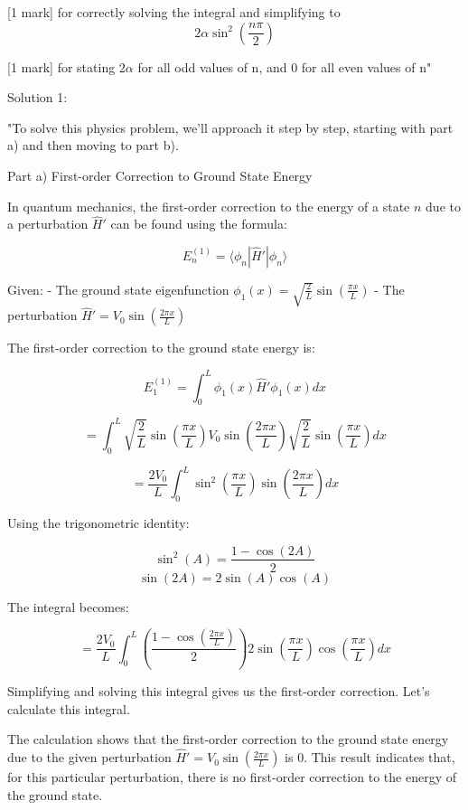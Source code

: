 [1 mark] for correctly solving the integral and simplifying to 
\[ 2 \alpha \sin^{2}\left(\frac{n \pi}{2} \right) \]

[1 mark] for stating \(2 \alpha \) for all odd values of n, and 0 for all even values of n"

Solution 1: 

"To solve this physics problem, we'll approach it step by step, starting with part a) and then moving to part b).

Part a) First-order Correction to Ground State Energy

In quantum mechanics, the first-order correction to the energy of a state \( n \) due to a perturbation \( \hat{H}' \) can be found using the formula:

\[ E_n^{(1)} = \langle \phi_n | \hat{H}' | \phi_n \rangle \]

Given:
- The ground state eigenfunction \( \phi_1(x) = \sqrt{\frac{2}{L}} \sin\left(\frac{\pi x}{L} \right) \)
- The perturbation \( \hat{H}' = V_0 \sin\left(\frac{2 \pi x}{L} \right) \)

The first-order correction to the ground state energy is:

\[ E_1^{(1)} = \int_0^L \phi_1(x) \hat{H}' \phi_1(x) dx \]

\[ = \int_0^L \sqrt{\frac{2}{L}} \sin\left(\frac{\pi x}{L} \right) V_0 \sin\left(\frac{2 \pi x}{L} \right) \sqrt{\frac{2}{L}} \sin\left(\frac{\pi x}{L} \right) dx \]

\[ = \frac{2V_0}{L} \int_0^L \sin^2\left(\frac{\pi x}{L} \right) \sin\left(\frac{2 \pi x}{L} \right) dx \]

Using the trigonometric identity:

\[ \sin^2(A) = \frac{1 - \cos(2A)}{2} \]
\[ \sin(2A) = 2\sin(A)\cos(A) \]

The integral becomes:

\[ = \frac{2V_0}{L} \int_0^L \left(\frac{1 - \cos\left(\frac{2\pi x}{L}\right)}{2}\right) 2\sin\left(\frac{\pi x}{L}\right)\cos\left(\frac{\pi x}{L}\right) dx \]

Simplifying and solving this integral gives us the first-order correction. Let's calculate this integral.

The calculation shows that the first-order correction to the ground state energy due to the given perturbation \( \hat{H}' = V_0 \sin\left(\frac{2 \pi x}{L} \right) \) is \( 0 \). This result indicates that, for this particular perturbation, there is no first-order correction to the energy of the ground state.

